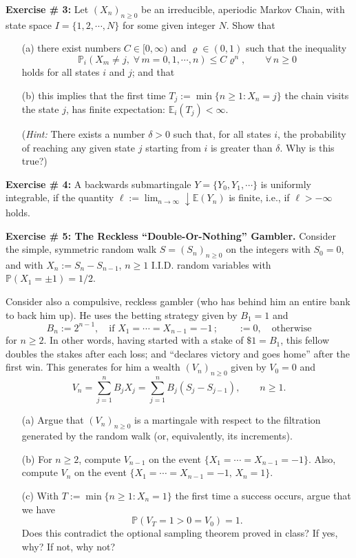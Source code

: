 \textbf{Exercise \# 3:} Let $(X_n)_{n \geq 0}$ be an irreducible, aperiodic Markov Chain, with state space $I = \{1, 2, \cdots, N\}$ for some given integer $N$. Show that
\begin{itemize}
    \item[(a)] there exist numbers $C \in [0, \infty)$ and $\varrho \in (0,1)$ such that the inequality
    \[
        \mathbb{P}_i\!\left(X_m \neq j,\; \forall\, m = 0, 1, \cdots, n\right) \leq C\varrho^n, \qquad \forall\, n \geq 0
    \]
    holds for all states $i$ and $j$; and that

    \item[(b)] this implies that the first time $T_j := \min\{n \geq 1 : X_n = j\}$ the chain visits the state $j$, has finite expectation: $\mathbb{E}_i(T_j) < \infty$.

    (\textit{Hint:} There exists a number $\delta > 0$ such that, for all states $i$, the probability of reaching any given state $j$ starting from $i$ is greater than $\delta$. Why is this true?)
\end{itemize}

\textbf{Exercise \# 4:} A backwards submartingale $Y = \{Y_0, Y_1, \cdots\}$ is uniformly integrable, if the quantity $\ell := \lim_{n \to \infty} \downarrow \mathbb{E}(Y_n)$ is finite, i.e., if $\ell > -\infty$ holds.

\textbf{Exercise \# 5: The Reckless ``Double-Or-Nothing'' Gambler.} Consider the simple, symmetric random walk $S = \left(S_n\right)_{n \geq 0}$ on the integers with $S_0 = 0$, and with $X_n := S_n - S_{n-1}$, $n \geq 1$ I.I.D. random variables with $\mathbb{P}(X_1 = \pm 1) = 1/2$.

Consider also a compulsive, reckless gambler (who has behind him an entire bank to back him up). He uses the betting strategy given by $B_1 = 1$ and
\[
    B_n := 2^{n-1}, \quad \text{if } X_1 = \cdots = X_{n-1} = -1\,; \qquad := 0, \quad \text{otherwise}
\]
for $n \geq 2$. In other words, having started with a stake of $\$1 = B_1$, this fellow doubles the stakes after each loss; and ``declares victory and goes home'' after the first win. This generates for him a wealth $\left(V_n\right)_{n \geq 0}$ given by $V_0 = 0$ and
\[
    V_n = \sum_{j=1}^{n} B_j X_j = \sum_{j=1}^{n} B_j \left(S_j - S_{j-1}\right), \qquad n \geq 1.
\]

\begin{itemize}
    \item[(a)] Argue that $\left(V_n\right)_{n \geq 0}$ is a martingale with respect to the filtration generated by the random walk (or, equivalently, its increments).

    \item[(b)] For $n \geq 2$, compute $V_{n-1}$ on the event $\{X_1 = \cdots = X_{n-1} = -1\}$. Also, compute $V_n$ on the event $\{X_1 = \cdots = X_{n-1} = -1,\, X_n = 1\}$.

    \item[(c)] With $T := \min\{n \geq 1 : X_n = 1\}$ the first time a success occurs, argue that we have
    \[
        \mathbb{P}\!\left(V_T = 1 > 0 = V_0\right) = 1.
    \]
    Does this contradict the optional sampling theorem proved in class? If yes, why? If not, why not?
\end{itemize}

